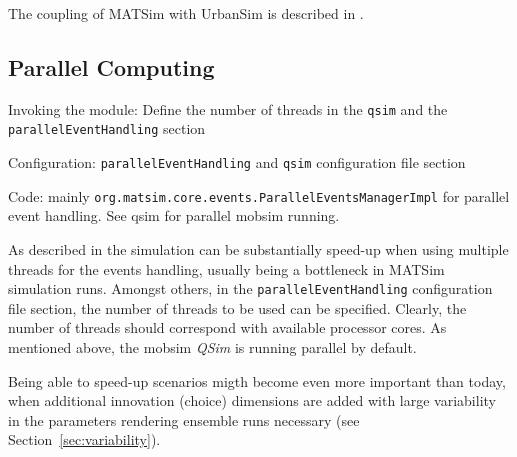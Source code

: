 The coupling of MATSim with UrbanSim \citep[][]{Waddell_unpub_UrbanSimTutorial_2010} is described in \citet[][]{NicolaiEtAl_TechRep_VSP_2011,NicolaiEtAl_ERSA_2011}.

\subsection{Parallel Computing}
\label{sec:parallelcomputing}
\begin{compactitem}
\item Invoking the module: Define the number of threads in the \lstinline|qsim| and the \lstinline|parallelEventHandling| section
\item Configuration: \lstinline|parallelEventHandling| and \lstinline|qsim| configuration file section
\item Code: mainly \lstinline|org.matsim.core.events.ParallelEventsManagerImpl| for parallel event handling. See qsim for parallel mobsim running.
\end{compactitem}

As described in \citet[][]{WaraichEtAl_TechRep_IVT_2009, WaraichEtAl_STRC_2009} the simulation can be substantially speed-up when using multiple threads for the events handling, usually being a bottleneck in MATSim simulation runs. Amongst others, in the \lstinline|parallelEventHandling| configuration file section, the number of threads to be used can be specified. Clearly, the number of threads should correspond with available processor cores. As mentioned above, the mobsim \emph{QSim} is running parallel by default.

Being able to speed-up scenarios migth become even more important than today, when additional innovation (choice) dimensions are added with large variability in the parameters rendering ensemble runs necessary (see Section~\ref{sec:variability}).



